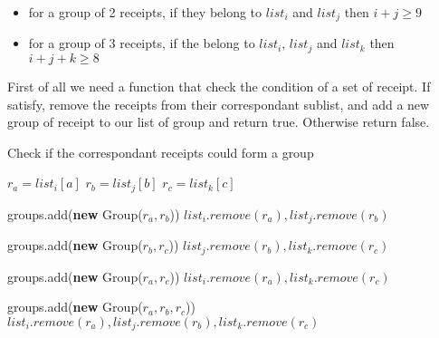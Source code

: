 \begin{itemize}
\item for a group of 2 receipts, if they belong to $list_{i}$ and $list_{j}$ then $i+j \geq 9$
\item for a group of 3 receipts, if the belong to $list_{i}$, $list_{j}$ and $list_{k}$ then $i+j+k \geq 8$
\end{itemize}


First of all we need a function that check the condition of a set of receipt. If satisfy, remove the receipts from their correspondant sublist, and add a new group of receipt to our list of group and return true. Otherwise return false.

\begin{algorithm}[H]
\caption{Check if the correspondant receipts could form a group}
\begin{algorithmic}

\State $r_{a} = list_{i}[a]$
\State $r_{b} = list_{j}[b]$
\State $r_{c} = list_{k}[c]$

	\State groups.add(\textbf{new} Group($r_a, r_b$))
	\State $list_i.remove(r_a), list_j.remove(r_b)$
	\State {}
\EndIf

	\State groups.add(\textbf{new} Group($r_b, r_c$))
	\State $list_j.remove(r_b), list_k.remove(r_c)$
	\State {}
\EndIf

	\State groups.add(\textbf{new} Group($r_a, r_c$))
	\State $list_i.remove(r_a), list_k.remove(r_c)$
	\State {}
\EndIf

	\State groups.add(\textbf{new} Group($r_a, r_b, r_c$))
	\State $list_i.remove(r_a), list_j.remove(r_b), list_k.remove(r_c)$
	\State {}
\EndIf

\EndFunction
\end{algorithmic}
\end{algorithm}
